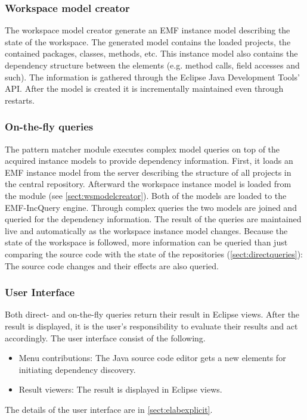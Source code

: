 \subsubsection{Workspace model creator}\label{sect:wsmodelcreator}
The workspace model creator generate an EMF instance model describing the
state of the workspace. The generated model contains the loaded projects, the
contained packages, classes, methods, etc. This instance model also contains the
dependency structure between the elements (e.g. method calls, field accesses and
such). The information is gathered through the Eclipse Java Development Tools'
API. After the model is created it is incrementally maintained even through 
restarts.

\subsubsection{On-the-fly queries}
The pattern matcher module executes complex model queries on top of the acquired
instance models to provide dependency information. First, it loads an EMF
instance model from the server describing the structure of all projects in the
central repository. Afterward the workspace instance model is loaded from the
module (see \autoref{sect:wsmodelcreator}). Both of the models are loaded to the
EMF-IncQuery engine. Through complex queries the two models are joined and
queried for the dependency information. The result of the queries are maintained
live and automatically as the workspace instance model changes. Because the
state of the workspace is followed, more information can be queried than just
comparing the source code with the state of the repositories
(\autoref{sect:directqueries}): The source code changes and their effects
are also queried.

\subsubsection{User Interface}
Both direct- and on-the-fly queries return their result in Eclipse views. After
the result is displayed, it is the user's responsibility to evaluate their
results and act accordingly. The user interface consist of the following.
\begin{itemize}
  \item Menu contributions: The Java source code editor gets a new elements for 
initiating dependency discovery.
  \item Result viewers: The result is displayed in Eclipse views.
\end{itemize}
The details of the user interface are in \autoref{sect:elabexplicit}.

